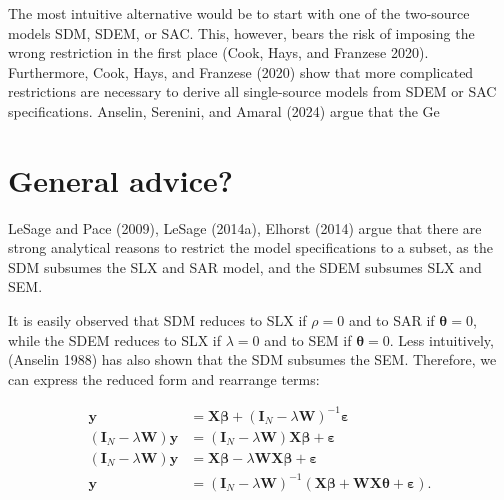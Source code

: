 \documentclass[
  letterpaper,
]{scrbook}
\begin{document}
The most intuitive alternative would be to start with one of the
two-source models SDM, SDEM, or SAC. This, however, bears the risk of
imposing the wrong restriction in the first place (Cook, Hays, and
Franzese 2020). Furthermore, Cook, Hays, and Franzese (2020) show that
more complicated restrictions are necessary to derive all single-source
models from SDEM or SAC specifications. Anselin, Serenini, and Amaral
(2024) argue that the Ge

\hypertarget{general-advice}{%
\section{General advice?}\label{general-advice}}

LeSage and Pace (2009), LeSage (2014a), Elhorst (2014) argue that there
are strong analytical reasons to restrict the model specifications to a
subset, as the SDM subsumes the SLX and SAR model, and the SDEM subsumes
SLX and SEM.

It is easily observed that SDM reduces to SLX if \(\rho=0\) and to SAR
if \({\boldsymbol{\mathbf{\theta}}}=0\), while the SDEM reduces to SLX
if \(\lambda=0\) and to SEM if \({\boldsymbol{\mathbf{\theta}}}=0\).
Less intuitively, (Anselin 1988) has also shown that the SDM subsumes
the SEM. Therefore, we can express the reduced form and rearrange terms:

\[
\begin{split}
{\boldsymbol{\mathbf{y}}}&= {\boldsymbol{\mathbf{X}}}{\boldsymbol{\mathbf{\beta}}} + ({\boldsymbol{\mathbf{I}}_N}-\lambda {\boldsymbol{\mathbf{W}}})^{-1}{\boldsymbol{\mathbf{\varepsilon}}} \\
({\boldsymbol{\mathbf{I}}_N}-\lambda {\boldsymbol{\mathbf{W}}}){\boldsymbol{\mathbf{y}}}&= ({\boldsymbol{\mathbf{I}}_N}-\lambda {\boldsymbol{\mathbf{W}}}){\boldsymbol{\mathbf{X}}}{\boldsymbol{\mathbf{\beta}}} + {\boldsymbol{\mathbf{\varepsilon}}} \\
({\boldsymbol{\mathbf{I}}_N}-\lambda {\boldsymbol{\mathbf{W}}}){\boldsymbol{\mathbf{y}}}&={\boldsymbol{\mathbf{X}}}{\boldsymbol{\mathbf{\beta}}} -\lambda{\boldsymbol{\mathbf{W}}}{\boldsymbol{\mathbf{X}}}{\boldsymbol{\mathbf{\beta}}} + {\boldsymbol{\mathbf{\varepsilon}}} \\
{\boldsymbol{\mathbf{y}}}&=({\boldsymbol{\mathbf{I}}_N}-\lambda {\boldsymbol{\mathbf{W}}})^{-1}({\boldsymbol{\mathbf{X}}}{\boldsymbol{\mathbf{\beta}}} + {\boldsymbol{\mathbf{W}}}{\boldsymbol{\mathbf{X}}}{\boldsymbol{\mathbf{\theta}}} + {\boldsymbol{\mathbf{\varepsilon}}}). 
\end{split}
\]
\end{document}
